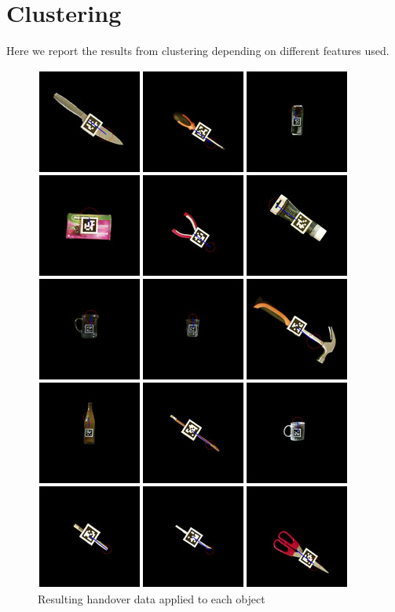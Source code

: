 %


\section{Clustering}
Here we report the results from clustering depending on different features used.

\begin{figure}
	\centering
	\includegraphics[width=\textwidth]{img/results/object_handovers.jpg}
	\caption{Resulting handover data applied to each object}
	\label{fig:object_handovers}
\end{figure}

